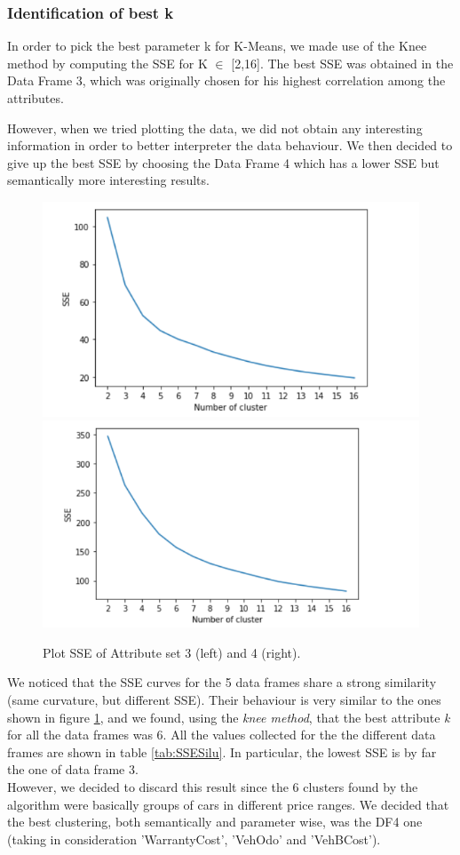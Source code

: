 \documentclass{article}
\begin{document}
	
	\subsubsection{Identification of best k}
	
	
	In order to pick the best parameter k for K-Means, we made use of the Knee method by computing the SSE for K $\in$ [2,16]. The best SSE was obtained in the Data Frame 3, which was originally chosen for his highest correlation among the attributes.
	
	However, when we tried plotting the data, we did not obtain any interesting information in order to better interpreter the data behaviour. We then decided to give up the best SSE by choosing the Data Frame 4 which has a lower SSE but semantically more interesting results.
	
	
	\begin{figure}[H]
		\centering
		\includegraphics[width=.4\textwidth]{cattura}\hspace{1cm}
		\includegraphics[width=.4\textwidth]{SSE2}
		\caption{Plot SSE of Attribute set 3 (left) and 4 (right).}
		\label{fig:KmeansSSE}
	\end{figure}
	We noticed that the SSE curves for the 5 data frames share a strong similarity (same curvature, but different SSE). Their behaviour is very similar to the ones shown in figure \ref{fig:KmeansSSE}, and we found, using the \emph{knee method}, that the best attribute \emph{k} for all the data frames was 6. All the values collected for the the different data frames are shown in table \ref{tab:SSESilu}. In particular, the lowest SSE is by far the one of data frame 3. \\However, we decided to discard this result since the 6 clusters found by the algorithm were basically groups of cars in different price ranges. We decided that the best clustering, both semantically and parameter wise, was the DF4 one (taking in consideration 'WarrantyCost', 'VehOdo' and 'VehBCost').
	
\end{document}
